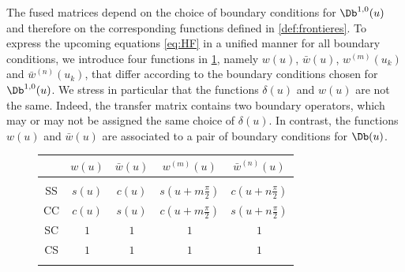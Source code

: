 \documentclass[11pt]{article}
\numberwithin{equation}{section}
\theoremstyle{alexi}
\begin{document}
The fused matrices depend on the choice of boundary conditions for $\Db^{1,0}(u)$ and therefore on the corresponding functions defined in \eqref{def:frontieres}. To express the upcoming equations \eqref{eq:HF} in a unified manner for all boundary conditions, we introduce four functions in  \cref{tab:lesPoids}, namely $w(u)$, $\bar w(u)$, $w^{(m)}(u_k)$ and $\bar w^{(n)}(u_k)$, that differ according to the boundary conditions chosen for $\Db^{1,0}(u)$. We stress in particular that the functions $\delta(u)$ and $w(u)$ are not the same. Indeed, the transfer matrix contains two boundary operators, which may or may not be assigned the same choice of $\delta(u)$. In contrast, the functions $w(u)$ and $\bar w(u)$ are associated to a pair of boundary conditions for $\Db(u)$.
\begin{figure}[h!]
\begin{center}
\begin{tabular}{c|cccc}
 & $w(u)$ & $\bar w(u)$ & $w^{(m)}(u)$ & $\bar w^{(n)}(u)$ 
 \\[0.10cm]
\hline
&&& & \\[-0.3cm]
SS & $s(u)$ & $c(u)$ & $s(u+m\frac{\pi}2)$ & $c(u+n\frac{\pi}2)$  \\
CC & $c(u)$ & $s(u)$ & $c(u+m\frac{\pi}2)$ & $s(u+n\frac{\pi}2)$  \\
SC & $1$ & $1$ & $1$ & $1$  \\
CS & $1$ & $1$ & $1$ & $1$ \\
&&& & \\[-0.3cm]
\end{tabular}
\label{tab:lesPoids}
\end{center}
\end{figure}
\end{document}

